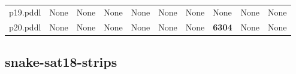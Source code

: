 \documentclass{article}
\begin{document}
\begin{tabular}{@{}lrrrrrrrrr@{}}
p19.pddl & \multicolumn{1}{|l|}{None} & \multicolumn{1}{|l|}{None} & \multicolumn{1}{|l|}{None} & \multicolumn{1}{|l|}{None} & \multicolumn{1}{|l|}{None} & \multicolumn{1}{|l|}{None} & \multicolumn{1}{|l|}{None} & \multicolumn{1}{|l|}{None} & \multicolumn{1}{|l|}{None} \\
p20.pddl & \multicolumn{1}{|l|}{None} & \multicolumn{1}{|l|}{None} & \multicolumn{1}{|l|}{None} & \multicolumn{1}{|l|}{None} & \multicolumn{1}{|l|}{None} & \multicolumn{1}{|l|}{None} & \textbf{6304} & \multicolumn{1}{|l|}{None} & \multicolumn{1}{|l|}{None} \\
\end{tabular}

\hypertarget{restrictions-snake-sat18-strips}{}
\subsection*{snake-sat18-strips}
\end{document}
